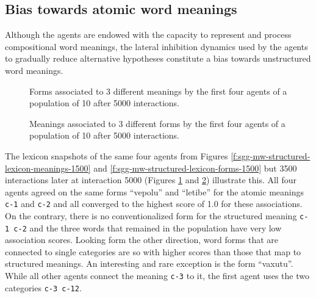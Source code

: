 \subsection{Bias towards atomic word meanings}
\label{s:bias-toward-atomic-word-meanings}

Although the agents are endowed with the capacity to represent and
process compositional word meanings, the lateral inhibition dynamics
used by the agents to gradually reduce alternative hypotheses
constitute a bias towards unstructured word meanings. 

\startfiguregroup

\begin{figure}[t]
  
  \caption{Forms associated to 3 different meanings by the first four
    agents of a population of 10 after 5000 interactions.}
  \label{f:sgg-mw-structured-lexicon-meanings-5000}
\end{figure}

\begin{figure}[t]
  
  \caption{Meanings associated to 3 different forms by the first four
    agents of a population of 10 after 5000 interactions.}
  \label{f:sgg-mw-structured-lexicon-forms-5000}
\end{figure}

\stopfiguregroup

The lexicon snapshots of the same four agents from Figures
\ref{f:sgg-mw-structured-lexicon-meanings-1500} and
\ref{f:sgg-mw-structured-lexicon-forms-1500} but 3500 interactions
later at interaction 5000 (Figures
\ref{f:sgg-mw-structured-lexicon-meanings-5000} and
\ref{f:sgg-mw-structured-lexicon-forms-5000}) illustrate this. All
four agents agreed on the same forms ``vepolu'' and ``letibe'' for the
atomic meanings \texttt{c-1} and \texttt{c-2} and all converged to the
highest score of 1.0 for these associations. On the contrary, there is
no conventionalized form for the structured meaning \texttt{c-1 c-2}
and the three words that remained in the population have very low
association scores. Looking form the other direction, word forms that
are connected to single categories are so with higher scores than
those that map to structured meanings. An interesting and rare
exception is the form ``vaxutu''. While all other agents connect the
meaning \texttt{c-3} to it, the first agent uses the two categories
\texttt{c-3 c-12}.


